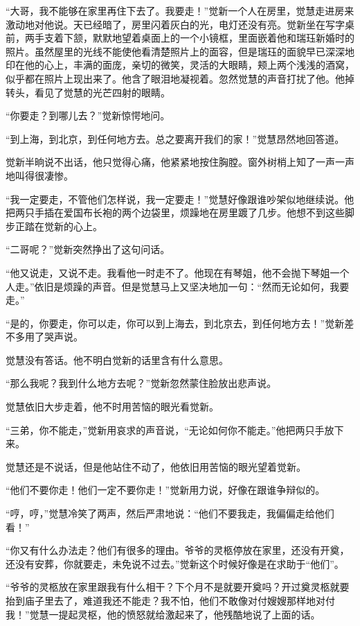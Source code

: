 \par “大哥，我不能够在家里再住下去了。我要走！”觉新一个人在房里，觉慧走进房来激动地对他说。天已经暗了，房里闪着灰白的光，电灯还没有亮。觉新坐在写字桌前，两手支着下颔，默默地望着桌面上的一个小镜框，里面嵌着他和瑞珏新婚时的照片。虽然屋里的光线不能使他看清楚照片上的面容，但是瑞珏的面貌早已深深地印在他的心上，丰满的面庞，亲切的微笑，灵活的大眼睛，颊上两个浅浅的酒窝，似乎都在照片上现出来了。他含了眼泪地凝视着。忽然觉慧的声音打扰了他。他掉转头，看见了觉慧的光芒四射的眼睛。
\par “你要走？到哪儿去？”觉新惊愕地问。
\par “到上海，到北京，到任何地方去。总之要离开我们的家！”觉慧昂然地回答道。
\par 觉新半晌说不出话，他只觉得心痛，他紧紧地按住胸膛。窗外树梢上知了一声一声地叫得很凄惨。
\par “我一定要走，不管他们怎样说，我一定要走！”觉慧好像跟谁吵架似地继续说。他把两只手插在爱国布长袍的两个边袋里，烦躁地在房里踱了几步。他想不到这些脚步正踏在觉新的心上。
\par “二哥呢？”觉新突然挣出了这句问话。
\par “他又说走，又说不走。我看他一时走不了。他现在有琴姐，他不会抛下琴姐一个人走。”依旧是烦躁的声音。但是觉慧马上又坚决地加一句：“然而无论如何，我要走。”
\par “是的，你要走，你可以走，你可以到上海去，到北京去，到任何地方去！”觉新差不多用了哭声说。
\par 觉慧没有答话。他不明白觉新的话里含有什么意思。
\par “那么我呢？我到什么地方去呢？”觉新忽然蒙住脸放出悲声说。
\par 觉慧依旧大步走着，他不时用苦恼的眼光看觉新。
\par “三弟，你不能走，”觉新用哀求的声音说，“无论如何你不能走。”他把两只手放下来。
\par 觉慧还是不说话，但是他站住不动了，他依旧用苦恼的眼光望着觉新。
\par “他们不要你走！他们一定不要你走！”觉新用力说，好像在跟谁争辩似的。
\par “哼，哼，”觉慧冷笑了两声，然后严肃地说：“他们不要我走，我偏偏走给他们看！”
\par “你又有什么办法走？他们有很多的理由。爷爷的灵柩停放在家里，还没有开奠，还没有安葬，你就要走，未免说不过去。”觉新这个时候好像是在求助于“他们”。
\par “爷爷的灵柩放在家里跟我有什么相干？下个月不是就要开奠吗？开过奠灵柩就要抬到庙子里去了，难道我还不能走？我不怕，他们不敢像对付嫂嫂那样地对付我！”觉慧一提起灵枢，他的愤怒就给激起来了，他残酷地说了上面的话。
